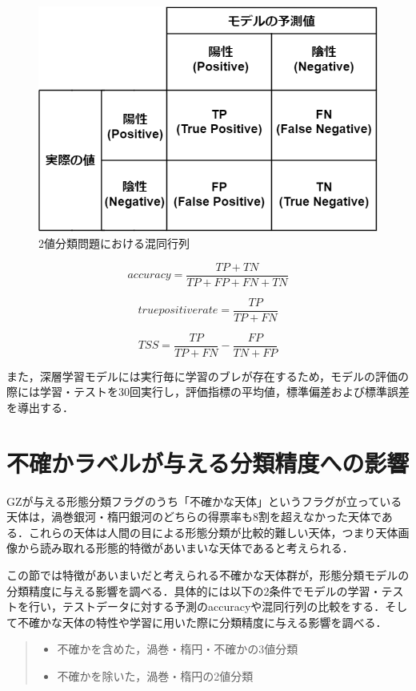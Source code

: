 \documentclass[a4j, 11pt]{jreport}
\begin{document}
\begin{figure}[H]
 \centering
 \includegraphics[width=12cm]{images/cm.png}
 \caption{2値分類問題における混同行列}
 \label{fig:cm}
\end{figure}

\begin{equation}
 accuracy = \frac{TP + TN}{TP + FP + FN + TN}
 \label{equ:accuracy}
\end{equation}

\begin{equation}
 true positive rate = \frac{TP}{TP + FN}
 \label{}
\end{equation}

\begin{equation}
	TSS = \frac{TP}{TP + FN} - \frac{FP}{TN + FP}
 \label{equ:tss}
\end{equation}

また，深層学習モデルには実行毎に学習のブレが存在するため，モデルの評価の際には学習・テストを30回実行し，評価指標の平均値，標準偏差および標準誤差を導出する．

\section{不確かラベルが与える分類精度への影響}
GZが与える形態分類フラグのうち「不確かな天体」というフラグが立っている天体は，渦巻銀河・楕円銀河のどちらの得票率も8割を超えなかった天体である．これらの天体は人間の目による形態分類が比較的難しい天体，つまり天体画像から読み取れる形態的特徴があいまいな天体であると考えられる．

この節では特徴があいまいだと考えられる不確かな天体群が，形態分類モデルの分類精度に与える影響を調べる．具体的には以下の2条件でモデルの学習・テストを行い，テストデータに対する予測のaccuracyや混同行列の比較をする．そして不確かな天体の特性や学習に用いた際に分類精度に与える影響を調べる．
\begin{quote}
 \begin{itemize}
	\item 不確かを含めた，渦巻・楕円・不確かの3値分類
	\item 不確かを除いた，渦巻・楕円の2値分類
 \end{itemize}
\end{quote}
\end{document}
